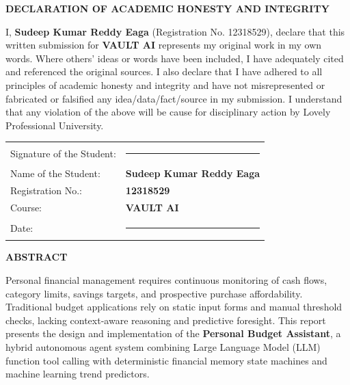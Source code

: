 \documentclass[12pt,a4paper,oneside]{report}
\newcommand*{\name}{Sudeep Kumar Reddy Eaga}
\newcommand*{\id}{12318529}
\newcommand*{\course}{VAULT AI}
\begin{document}
\newpage

\thispagestyle{plain}
\begin{center}
    \Large \textbf{DECLARATION OF ACADEMIC HONESTY AND INTEGRITY}
\end{center}

\vspace{0.8cm}

\noindent I, \textbf{\name} (Registration No. \id), declare that this written submission for \textbf{\course} represents my original work in my own words. Where others' ideas or words have been included, I have adequately cited and referenced the original sources. I also declare that I have adhered to all principles of academic honesty and integrity and have not misrepresented or fabricated or falsified any idea/data/fact/source in my submission. I understand that any violation of the above will be cause for disciplinary action by Lovely Professional University.

\vspace{2.5cm}

\noindent \begin{tabular}{@{}l l}
Signature of the Student: & \rule{6cm}{0.4pt} \\[0.8cm]
Name of the Student: & \textbf{\name} \\[0.3cm]
Registration No.: & \textbf{\id} \\[0.3cm]
Course: & \textbf{\course} \\[0.3cm]
Date: & \rule{4cm}{0.4pt} \\
\end{tabular}

\newpage

\thispagestyle{plain}
\begin{center}
    \Large \textbf{ABSTRACT}
\end{center}

\vspace{0.5cm}

\noindent Personal financial management requires continuous monitoring of cash flows, category limits, savings targets, and prospective purchase affordability. Traditional budget applications rely on static input forms and manual threshold checks, lacking context-aware reasoning and predictive foresight. This report presents the design and implementation of the \textbf{Personal Budget Assistant}, a hybrid autonomous agent system combining Large Language Model (LLM) function tool calling with deterministic financial memory state machines and machine learning trend predictors.
\end{document}
